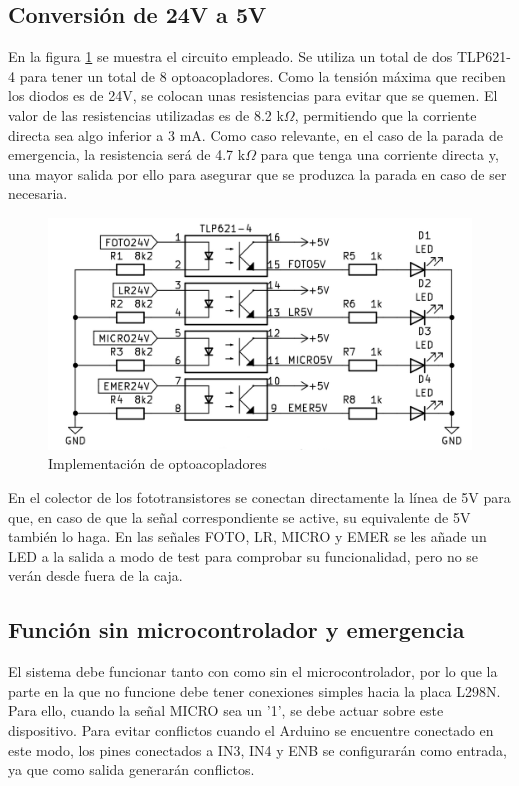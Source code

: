 \smallskip

\subsection{Conversión de 24V a 5V}
En la figura \ref{fig:figura34imp} se muestra el circuito empleado. Se utiliza un total de dos TLP621-4 para
tener un total de 8 optoacopladores. Como la tensión máxima que reciben los diodos es de 24V, se colocan
unas resistencias para evitar que se quemen. El valor de las resistencias utilizadas es de 8.2 k$\Omega$,
permitiendo que la corriente directa sea algo inferior a 3 mA. Como caso relevante, en el caso de la parada
de emergencia, la resistencia será de 4.7 k$\Omega$ para que tenga una corriente directa y, una mayor
salida por ello para asegurar que se produzca la parada en caso de ser necesaria.

\begin{figure}[hbtp]
    \centering
    \includegraphics[scale=1.25]{03-placa/03-optoacopladores.png}
    \caption{Implementación de optoacopladores}
    \label{fig:figura34imp}
    \end{figure}

En el colector de los fototransistores se conectan directamente la línea de 5V para que, en caso de que la
señal correspondiente se active, su equivalente de 5V también lo haga. En las señales FOTO, LR, MICRO y EMER
se les añade un LED a la salida a modo de test para comprobar su funcionalidad, pero no se verán desde fuera
de la caja.

\subsection{Función sin microcontrolador y emergencia}

El sistema debe funcionar tanto con como sin el microcontrolador, por lo que la parte en la que no funcione
debe tener conexiones simples hacia la placa L298N. Para ello, cuando la señal MICRO sea un '1', se debe 
actuar sobre este dispositivo. Para evitar conflictos cuando el Arduino se encuentre conectado en este modo,
los pines conectados a IN3, IN4 y ENB se configurarán como entrada, ya que como salida generarán conflictos.

